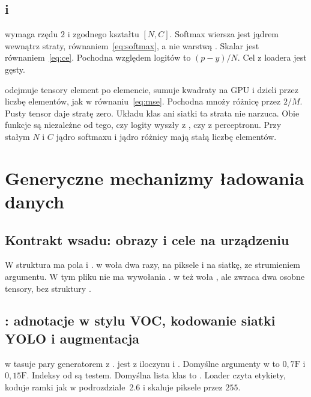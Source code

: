 \subsection{ i }

 wymaga rzędu \(2\) i zgodnego kształtu \([N, C]\). Softmax wiersza jest jądrem wewnątrz straty, równaniem~\eqref{eq:softmax}, a nie warstwą . Skalar jest równaniem~\eqref{eq:ce}. Pochodna względem logitów to \((p - y) / N\). Cel z loadera jest gęsty.

 odejmuje tensory element po elemencie, sumuje kwadraty na GPU i dzieli przez liczbę elementów, jak w równaniu~\eqref{eq:mse}. Pochodna mnoży różnicę przez \(2/M\). Pusty tensor daje stratę zero. Układu klas ani siatki ta strata nie narzuca. Obie funkcje są niezależne od tego, czy logity wyszły z , czy z perceptronu. Przy stałym \(N\) i \(C\) jądro softmaxu i jądro różnicy mają stałą liczbę elementów.

\section{Generyczne mechanizmy ładowania danych}

\subsection{Kontrakt wsadu: obrazy i cele na urządzeniu}

W  struktura  ma pola  i .  w  woła  dwa razy, na piksele i na siatkę, ze strumieniem argumentu. W tym pliku nie ma wywołania .  w  też woła , ale zwraca dwa osobne tensory, bez struktury .

\subsection{: adnotacje w stylu VOC, kodowanie siatki YOLO i augmentacja}

 w  tasuje pary generatorem  z .  jest  z iloczynu  i . Domyślne argumenty w  to  \(0{,}7\mathrm{F}\) i  \(0{,}15\mathrm{F}\). Indeksy od  są testem. Domyślna lista klas to . Loader czyta etykiety, koduje ramki jak w podrozdziale~2.6 i skaluje piksele przez \(255\).

